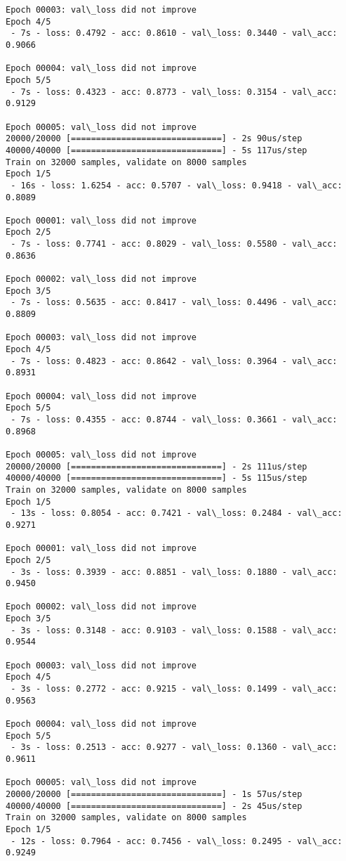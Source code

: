 \documentclass[11pt]{article}
\begin{document}
\begin{Verbatim}[commandchars=\\\{\}]
Epoch 00003: val\_loss did not improve
Epoch 4/5
 - 7s - loss: 0.4792 - acc: 0.8610 - val\_loss: 0.3440 - val\_acc: 0.9066

Epoch 00004: val\_loss did not improve
Epoch 5/5
 - 7s - loss: 0.4323 - acc: 0.8773 - val\_loss: 0.3154 - val\_acc: 0.9129

Epoch 00005: val\_loss did not improve
20000/20000 [==============================] - 2s 90us/step
40000/40000 [==============================] - 5s 117us/step
Train on 32000 samples, validate on 8000 samples
Epoch 1/5
 - 16s - loss: 1.6254 - acc: 0.5707 - val\_loss: 0.9418 - val\_acc: 0.8089

Epoch 00001: val\_loss did not improve
Epoch 2/5
 - 7s - loss: 0.7741 - acc: 0.8029 - val\_loss: 0.5580 - val\_acc: 0.8636

Epoch 00002: val\_loss did not improve
Epoch 3/5
 - 7s - loss: 0.5635 - acc: 0.8417 - val\_loss: 0.4496 - val\_acc: 0.8809

Epoch 00003: val\_loss did not improve
Epoch 4/5
 - 7s - loss: 0.4823 - acc: 0.8642 - val\_loss: 0.3964 - val\_acc: 0.8931

Epoch 00004: val\_loss did not improve
Epoch 5/5
 - 7s - loss: 0.4355 - acc: 0.8744 - val\_loss: 0.3661 - val\_acc: 0.8968

Epoch 00005: val\_loss did not improve
20000/20000 [==============================] - 2s 111us/step
40000/40000 [==============================] - 5s 115us/step
Train on 32000 samples, validate on 8000 samples
Epoch 1/5
 - 13s - loss: 0.8054 - acc: 0.7421 - val\_loss: 0.2484 - val\_acc: 0.9271

Epoch 00001: val\_loss did not improve
Epoch 2/5
 - 3s - loss: 0.3939 - acc: 0.8851 - val\_loss: 0.1880 - val\_acc: 0.9450

Epoch 00002: val\_loss did not improve
Epoch 3/5
 - 3s - loss: 0.3148 - acc: 0.9103 - val\_loss: 0.1588 - val\_acc: 0.9544

Epoch 00003: val\_loss did not improve
Epoch 4/5
 - 3s - loss: 0.2772 - acc: 0.9215 - val\_loss: 0.1499 - val\_acc: 0.9563

Epoch 00004: val\_loss did not improve
Epoch 5/5
 - 3s - loss: 0.2513 - acc: 0.9277 - val\_loss: 0.1360 - val\_acc: 0.9611

Epoch 00005: val\_loss did not improve
20000/20000 [==============================] - 1s 57us/step
40000/40000 [==============================] - 2s 45us/step
Train on 32000 samples, validate on 8000 samples
Epoch 1/5
 - 12s - loss: 0.7964 - acc: 0.7456 - val\_loss: 0.2495 - val\_acc: 0.9249


\end{Verbatim}
\end{document}
